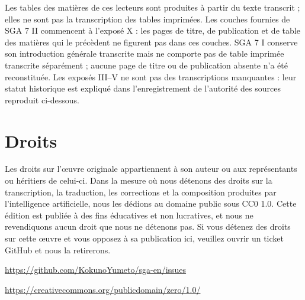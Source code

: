Les tables des matières de ces lecteurs sont produites à partir du texte transcrit ; elles ne sont pas la transcription des tables imprimées. Les couches fournies de SGA 7 II commencent à l’exposé X : les pages de titre, de publication et de table des matières qui le précèdent ne figurent pas dans ces couches. SGA 7 I conserve son introduction générale transcrite mais ne comporte pas de table imprimée transcrite séparément ; aucune page de titre ou de publication absente n’a été reconstituée. Les exposés III–V ne sont pas des transcriptions manquantes : leur statut historique est expliqué dans l’enregistrement de l’autorité des sources reproduit ci-dessous.

\section*{Droits}

Les droits sur l’œuvre originale appartiennent à son auteur ou aux représentants ou héritiers de celui-ci. Dans la mesure où nous détenons des droits sur la transcription, la traduction, les corrections et la composition produites par l’intelligence artificielle, nous les dédions au domaine public sous CC0 1.0. Cette édition est publiée à des fins éducatives et non lucratives, et nous ne revendiquons aucun droit que nous ne détenons pas. Si vous détenez des droits sur cette œuvre et vous opposez à sa publication ici, veuillez ouvrir un ticket GitHub et nous la retirerons.

\par\noindent\url{https://github.com/KokunoYumeto/sga-en/issues}

\par\noindent\url{https://creativecommons.org/publicdomain/zero/1.0/}

\clearpage
